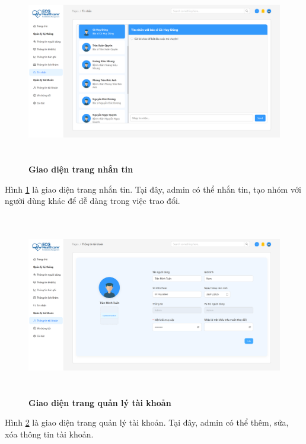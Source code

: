 \begin{figure}[H]
	\centering
	\includegraphics[width=15cm,height=8cm]{Images/admin_ui/chat.png}
	\caption[Giao diện trang nhắn tin]{\bfseries \fontsize{12pt}{0pt}\selectfont Giao diện trang nhắn tin}
	\label{chat-admin}
\end{figure}

Hình \ref{chat-admin} là giao diện trang nhắn tin. Tại đây, admin có thể nhắn tin, tạo nhóm với người dùng khác để dễ dàng trong việc trao đổi.

\begin{figure}[H]
	\centering
	\includegraphics[width=15cm,height=8cm]{Images/admin_ui/account.png}
	\caption[Giao diện trang quản lý tài khoản]{\bfseries \fontsize{12pt}{0pt}\selectfont Giao diện trang quản lý tài khoản}
	\label{account-admin}
\end{figure}

Hình \ref{account-admin} là giao diện trang quản lý tài khoản. Tại đây, admin có thể thêm, sửa, xóa thông tin tài khoản.

